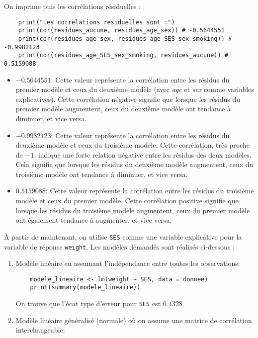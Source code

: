 \documentclass[../main.tex]{subfiles}
\begin{document}
\begin{CJK*}{UTF8}{gbsn}
On imprime puis les corrélations résiduelles :

\begin{lstlisting}
    print("Les correlations residuelles sont :")
    print(cor(residues_aucune, residues_age_sex)) # -0.5644551
    print(cor(residues_age_sex, residues_age_SES_sex_smoking)) # -0.9982123
    print(cor(residues_age_SES_sex_smoking, residues_aucune)) # 0.5159088
\end{lstlisting}

\begin{itemize}
    \item \(-0.5644551\): 
Cette valeur représente la corrélation entre les résidus du premier modèle  et ceux du deuxième modèle 
(avec \textit{age} et \textit{sex} comme variables explicatives). 
Cette corrélation négative signifie que lorsque les résidus du premier modèle augmentent, 
ceux du deuxième modèle ont tendance à diminuer, et vice versa.
    
    \item \(-0.9982123\): 
Cette valeur représente la corrélation entre les résidus du deuxième modèle et 
ceux du troisième modèle. Cette corrélation, très proche de $-1$, 
indique une forte relation négative entre les résidus des deux modèles. 
Cela signifie que lorsque les résidus du deuxième modèle augmentent, 
ceux du troisième modèle ont tendance à diminuer, et vice versa.
    
    \item \(0.5159088\): 
Cette valeur représente la corrélation entre les résidus du troisième modèle et ceux du premier modèle. 
Cette corrélation positive signifie que lorsque les résidus du troisième modèle augmentent, 
ceux du premier modèle ont également tendance à augmenter, et vice versa.
\end{itemize}
   
À partir de maintenant, on utilise \texttt{SES} comme une variable explicative pour la variable de réponse \texttt{weight}.
Les modèles démandés sont réalisés ci-dessous :

\begin{enumerate}
    \item Modèle linéaire en assumant l'indépendance entre toutes les observations:

\begin{lstlisting}
    modele_lineaire <- lm(weight ~ SES, data = donnee)
    print(summary(modele_lineaire))  
\end{lstlisting}

On trouve que l'écat type d'erreur pour \texttt{SES} est $0.1328$.
    \item Modèle linéaire généralisé (normale) où on assume une matrice de corrélation interchangeable:


\end{enumerate}
\end{CJK*}
\end{document}
